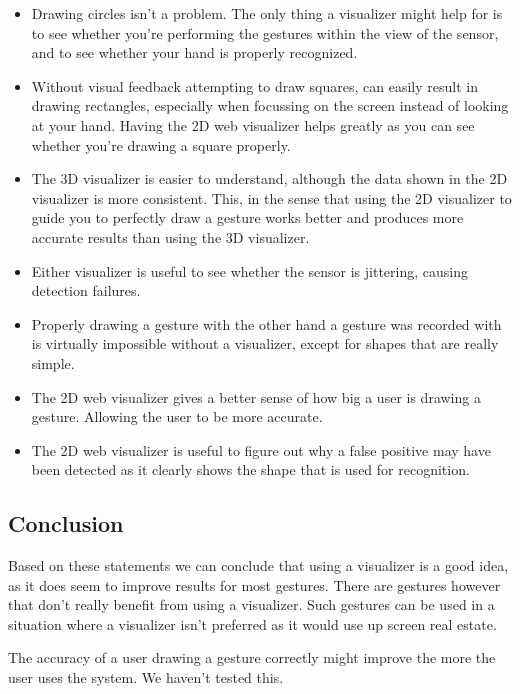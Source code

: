 \documentclass[a4paper]{article}
\begin{document}
  \begin{itemize}
    \item Drawing circles isn't a problem. The only thing a visualizer might
      help for is to see whether you're performing the gestures within the
      view of the sensor, and to see whether your hand is properly recognized.
    \item Without visual feedback attempting to draw squares, can easily result
      in drawing rectangles, especially when focussing on the screen instead of
      looking at your hand. Having the 2D web visualizer helps greatly as you
      can see whether you're drawing a square properly.
    \item The 3D visualizer is easier to understand, although the data shown in
      the 2D visualizer is more consistent. This, in the sense that using the 2D
      visualizer to guide you to perfectly draw a gesture works better and
      produces more accurate results than using the 3D visualizer.
    \item Either visualizer is useful to see whether the sensor is
      jittering, causing detection failures.
    \item Properly drawing a gesture with the other hand a gesture was
      recorded with is virtually impossible without a visualizer, except for
      shapes that are really simple.
    \item The 2D web visualizer gives a better sense of how big a user is
      drawing a gesture. Allowing the user to be more accurate.
    \item The 2D web visualizer is useful to figure out why a false positive may
      have been detected as it clearly shows the shape that is used for
      recognition.
  \end{itemize}

  \subsection{Conclusion}
  Based on these statements we can conclude that using a visualizer is a good
  idea, as it does seem to improve results for most gestures. There are gestures
  however that don't really benefit from using a visualizer. Such gestures can
  be used in a situation where a visualizer isn't preferred as it would use up
  screen real estate.

  The accuracy of a user drawing a gesture correctly might improve the more the
  user uses the system. We haven't tested this.
\end{document}
